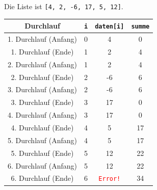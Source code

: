 \begin{myexercise}
	\begin{myanswer}
		Die Liste ist \lstinline|[4, 2, -6, 17, 5, 12]|.
		\begin{table}[H]
			\centering

			\begin{tabular}{cccc}
				\textbf{Durchlauf}    & \lstinline|i| & \lstinline|daten[i]|             & \lstinline|summe| \\\midrule
				1. Durchlauf (Anfang) & 0             & 4                                & 0                 \\\midrule
				1. Durchlauf (Ende)   & 1             & 2                                & 4                 \\\midrule
				2. Durchlauf (Anfang) & 1             & 2                                & 4                 \\\midrule
				2. Durchlauf (Ende)   & 2             & -6                               & 6                 \\\midrule
				3. Durchlauf (Anfang) & 2             & -6                               & 6                 \\\midrule
				3. Durchlauf (Ende)   & 3             & 17                               & 0                 \\\midrule
				4. Durchlauf (Anfang) & 3             & 17                               & 0                 \\\midrule
				4. Durchlauf (Ende)   & 4             & 5                                & 17                \\\midrule
				5. Durchlauf (Anfang) & 4             & 5                                & 17                \\\midrule
				5. Durchlauf (Ende)   & 5             & 12                               & 22                \\\midrule
				6. Durchlauf (Anfang) & 5             & 12                               & 22                \\\midrule
				6. Durchlauf (Ende)   & 6             & \textcolor{red}{\texttt{Error!}} & 34                \\
			\end{tabular}
		\end{table}
	\end{myanswer}
\end{myexercise}

